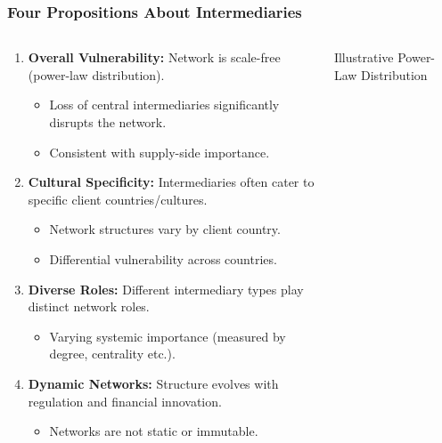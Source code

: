 \documentclass{beamer}
\begin{document}
\begin{frame}
    \frametitle{Four Propositions About Intermediaries}

    \begin{columns}[T]
        \begin{column}{0.8\textwidth}
            \begin{enumerate}
                \item \textbf{Overall Vulnerability:} Network is scale-free (power-law distribution).
                    \begin{itemize}
                        \item Loss of central intermediaries significantly disrupts the network.
                        \item Consistent with supply-side importance.
                    \end{itemize}

                \item \textbf{Cultural Specificity:} Intermediaries often cater to specific client countries/cultures.
                    \begin{itemize}
                        \item Network structures vary by client country.
                        \item Differential vulnerability across countries.
                    \end{itemize}

                \item \textbf{Diverse Roles:} Different intermediary types play distinct network roles.
                    \begin{itemize}
                        \item Varying systemic importance (measured by degree, centrality etc.).
                    \end{itemize}

                \item \textbf{Dynamic Networks:} Structure evolves with regulation and financial innovation.
                    \begin{itemize}
                        \item Networks are not static or immutable.
                    \end{itemize}
            \end{enumerate}
        \end{column}
        \begin{column}{0.2\textwidth}
            \begin{center}
                \scriptsize{Illustrative Power-Law Distribution}
            \end{center}
        \end{column}
    \end{columns}

\end{frame}
\end{document}
